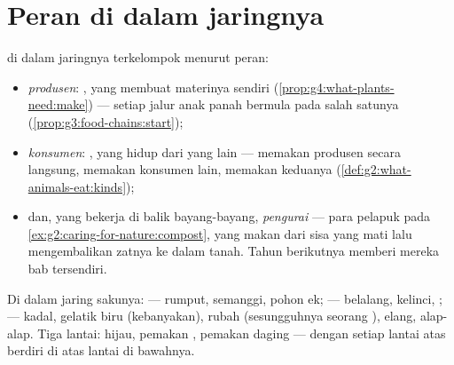 \section{Peran di dalam jaringnya}

\begin{definition}\label{def:g5:food-webs:roles}
 di dalam jaringnya terkelompok menurut peran:
\begin{itemize}
  \item \emph{produsen}: , yang membuat
        materinya sendiri
        (\cref{prop:g4:what-plants-need:make}) --- setiap jalur anak
        panah bermula pada salah satunya
        (\cref{prop:g3:food-chains:start});
  \item \emph{konsumen}: , yang hidup dari yang
        lain ---  memakan produsen secara langsung,
         memakan konsumen lain,  memakan keduanya
        (\cref{def:g2:what-animals-eat:kinds});
  \item dan, yang bekerja di balik bayang-bayang,
        \emph{pengurai} --- para pelapuk pada
        \cref{ex:g2:caring-for-nature:compost}, yang makan dari sisa
        yang mati lalu mengembalikan zatnya ke dalam tanah. Tahun
        berikutnya memberi mereka bab tersendiri.
\end{itemize}
\end{definition}

\begin{example}\label{ex:g5:food-webs:sorting}
Di dalam jaring sakunya:  --- rumput, semanggi, pohon ek;
  --- belalang, kelinci, ;   ---
kadal, gelatik biru (kebanyakan), rubah (sesungguhnya seorang
), elang, alap-alap. Tiga lantai: hijau, pemakan ,
pemakan daging --- dengan setiap lantai atas berdiri di atas lantai di
bawahnya.
\end{example}

